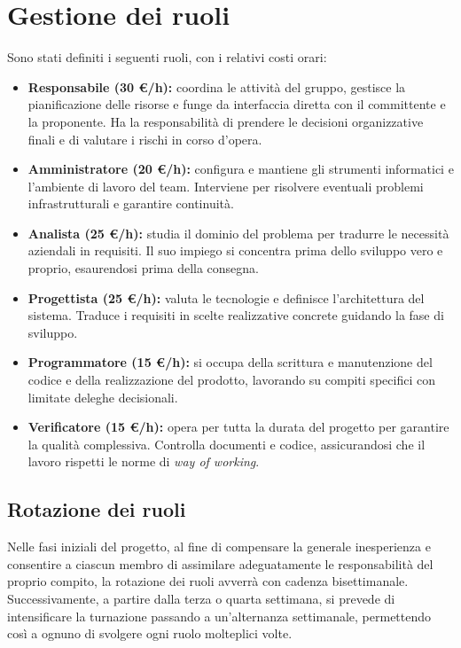\documentclass[11pt, a4paper]{article}
\begin{document}
\section{Gestione dei ruoli}
Sono stati definiti i seguenti ruoli, con i relativi costi orari:
\begin{itemize}
    \item \textbf{Responsabile (30 €/h):} coordina le attività del gruppo, gestisce la pianificazione delle risorse e funge da interfaccia diretta con il committente e la proponente. Ha la responsabilità di prendere le decisioni organizzative finali e di valutare i rischi in corso d'opera.
    
    \item \textbf{Amministratore (20 €/h):} configura e mantiene gli strumenti informatici e l'ambiente di lavoro del team. Interviene per risolvere eventuali problemi infrastrutturali e garantire continuità.
    
    \item \textbf{Analista (25 €/h):} studia il dominio del problema per tradurre le necessità aziendali in requisiti. Il suo impiego si concentra prima dello sviluppo vero e proprio, esaurendosi prima della consegna.
    
    \item \textbf{Progettista (25 €/h):} valuta le tecnologie e definisce l'architettura del sistema. Traduce i requisiti in scelte realizzative concrete guidando la fase di sviluppo.
    
    \item \textbf{Programmatore (15 €/h):} si occupa della scrittura e manutenzione del codice e della realizzazione del prodotto, lavorando su compiti specifici con limitate deleghe decisionali.
    
    \item \textbf{Verificatore (15 €/h):} opera per tutta la durata del progetto per garantire la qualità complessiva. Controlla documenti e codice, assicurandosi che il lavoro rispetti le norme di \textit{way of working}.
\end{itemize}

\subsection{Rotazione dei ruoli}
Nelle fasi iniziali del progetto, al fine di compensare la generale inesperienza e consentire a ciascun membro di assimilare adeguatamente le responsabilità del proprio compito, la rotazione dei ruoli avverrà con cadenza bisettimanale. Successivamente, a partire dalla terza o quarta settimana, si prevede di intensificare la turnazione passando a un'alternanza settimanale, permettendo così a ognuno di svolgere ogni ruolo molteplici volte. 
\end{document}
